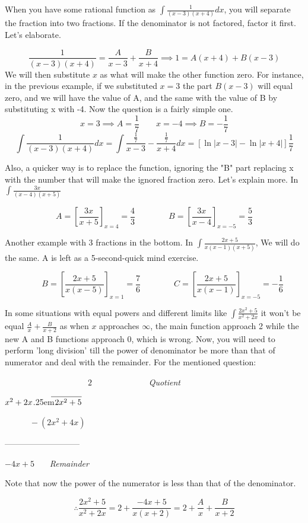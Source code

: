 \documentclass{article}
\newcommand\longdiv[2]{%
	$\strut#1$\kern.25em\smash{\raise.3ex\hbox{$\big)$}}$\mkern-8mu
	\overline{\enspace\strut#2}$}
\begin{document}
	When you have some rational function as $ \int \frac{1}{(x-3)(x+4)} dx $, you will separate the fraction into two fractions. If the denominator is not factored, factor it first. Let's elaborate.

	\[
		\frac{1}{(x-3)(x+4)} = \frac{A}{x-3} + \frac{B}{x+4} \implies 1=A(x+4)+B(x-3)
	\]
	We will then substitute $ x $ as what will make the other function zero. For instance, in the previous example, if we substituted $ x = 3 $ the part $ B(x-3) $ will equal zero, and we will have the value of A, and the same with the value of B by substituting x with -4. 
	Now the question is a fairly simple one.
	\[
		x=3 \implies A = \frac{1}{7} \qquad x=-4 \implies B =-\frac{1}{7}
	\]
	\[
		\int \frac{1}{(x-3)(x+4)} dx = \int \frac{ \frac{1}{7} }{ x-3 } - \frac{ \frac{1}{7} }{ x+4 } dx
		=[ \ln{|x-3|} - \ln{|x+4|} ] \frac{1}{7}
	\]

	Also, a quicker way is to replace the function, ignoring the "B" part replacing x with the number that will make the ignored fraction zero. Let's explain more.
	In $\int \frac{3x}{(x-4)(x+5)} $

	\[
		A = \left [ \frac{3x}{x+5} \right ]  _{x=4}
		= \frac{4}{3} \qquad \qquad B = \left [ \frac{3x}{x-4} \right ] _{x=-5} = \frac{5}{3}
	\]

	Another example with 3 fractions in the bottom. In $\int \frac{ 2x+5 }{ x(x-1)(x+5) }$, We will do the same. A is left as a 5-second-quick mind exercise.

	\[
		\qquad B = \left [ \frac{ 2x+5 }{ x(x-5) }    \right ]_{x=1} = \frac{7}{6} \qquad \qquad C = \left [ \frac{ 2x+5 }{ x(x-1) }   \right ]_{x=-5} = -\frac{1}{6} 
	\]

	In some situations with equal powers and different limits like $ \int \frac{ 2x^2+5 }{ x^2+2x }  $ it won't be equal $ \frac{A}{x} + \frac{B}{x+2} $ as when $ x $ approaches $ \infty $, the main function approach 2 while the new A and B functions approach 0, which is wrong. Now, you will need to perform 'long division' till the power of denominator be more than that of numerator and deal with the remainder. For the mentioned question: 
	\begin{center}

		$ \qquad \qquad \qquad \qquad  \qquad  2 $ \ \ \ \ \ \ \ \ \ \ \ \ \ \it{Quotient} \

		\longdiv{x^2+2x}{2x^2+5}

		$ \qquad  \quad -(2x^2+4x) $

		---------------------------

		\qquad \qquad \qquad \qquad \qquad 	$ -4x+5  $ \ \ \ \it{Remainder}

		Note that now the power of the numerator is less than that of the denominator.

		\[	
		\therefore \frac{ 2x^2 + 5 }{x^2+2x} =  2 + \frac{ -4x+5 }{ x(x+2) }
		= 2 + \frac{A}{x} + \frac{ B }{ x+2 } 
		\] 

	\end{center}
\end{document}
